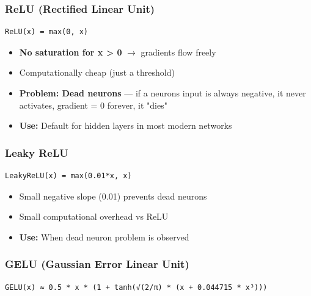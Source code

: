 \documentclass[11pt]{article}
\providecommand{\tightlist}{\setlength{\itemsep}{1pt}\setlength{\parskip}{0pt}}
\begin{document}
\subsubsection{ReLU (Rectified Linear Unit)}\label{relu-rectified-linear-unit}

\setcodelang{}

\begin{verbatim}
ReLU(x) = max(0, x)
\end{verbatim}

\begin{itemize}
\tightlist
\item
  \textbf{No saturation for x \textgreater{} 0} \(\rightarrow\) gradients flow freely
\item
  Computationally cheap (just a threshold)
\item
  \textbf{Problem: Dead neurons} --- if a neuron\textquotesingle s input is always negative, it never activates, gradient = 0 forever, it "dies"
\item
  \textbf{Use:} Default for hidden layers in most modern networks
\end{itemize}

\subsubsection{Leaky ReLU}\label{leaky-relu}

\setcodelang{}

\begin{verbatim}
LeakyReLU(x) = max(0.01*x, x)
\end{verbatim}

\begin{itemize}
\tightlist
\item
  Small negative slope (0.01) prevents dead neurons
\item
  Small computational overhead vs ReLU
\item
  \textbf{Use:} When dead neuron problem is observed
\end{itemize}

\subsubsection{GELU (Gaussian Error Linear Unit)}\label{gelu-gaussian-error-linear-unit}

\setcodelang{}

\begin{verbatim}
GELU(x) ≈ 0.5 * x * (1 + tanh(√(2/π) * (x + 0.044715 * x³)))
\end{verbatim}
\end{document}
